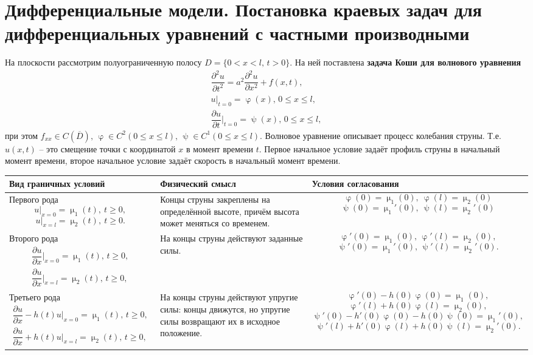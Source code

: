\documentclass[a4paper, 12pt]{report}
\numberwithin{equation}{section}
\renewcommand{\leq}{\leqslant}
\renewcommand{\geq}{\geqslant}
\renewcommand{\varphi}{\upvarphi}
\renewcommand{\psi}{\uppsi}
\renewcommand{\mu}{\upmu}
\newcommand{\pderiv}[2]{\dfrac{\partial #1}{\partial #2}}
\begin{document}
	\section{Дифференциальные модели. Постановка краевых задач для дифференциальных уравнений с частными производными}
	На плоскости рассмотрим полуограниченную полосу
	$D=\{0<x<l\text{, } t>0\}.$
	На ней поставлена \textbf{задача Коши для волнового уравнения}
	\begin{equation}
		\begin{gathered}
			\pderiv{^2u}{t^2}=a^2\pderiv{^2u}{x^2}+f(x,t),\\
			u|_{t=0}=\varphi(x)\text{, } 0\leq x\leq l,\\
			\pderiv{u}{t}\Bigr|_{t=0}=\psi(x)\text{, } 0\leq x\leq l,
		\end{gathered}
	\end{equation}
	при этом $f_{xx}\in C(\overline{D})\text{, } \varphi\in C^2(0\leq x\leq l)\text{, } \psi\in C^1(0\leq x\leq l).$
	Волновое уравнение описывает процесс колебания струны. Т.е. $u(x,t)$ -- это смещение точки с координатой $x$ в момент времени $t$. Первое начальное условие задаёт профиль струны в начальный момент времени, второе начальное условие задаёт скорость в начальный момент времени.
	\begin{table}[h!]
		\renewcommand{\arraystretch}{1.4}
		\begin{tabular}{|p{5.5cm}|p{4.5cm}|p{7cm}|}
			\hline
			\textbf{Вид граничных условий} & \textbf{Физический смысл} & \textbf{Условия согласования} \\
			\hline
			Первого рода $$u|_{x=0}=\mu_1(t),\ t \geq 0,$$ $$u|_{x=l}=\mu_2(t), \ t \geq 0.$$
			& 
			Концы струны закреплены на определённой высоте, причём высота может меняться со временем.
			& 
			$$\varphi(0)=\mu_1(0),\ \varphi(l)=\mu_2(0)$$  $$\psi(0)=\mu_1'(0),\ \psi(l)=\mu_2'(0)$$ \\
			\hline
			
			{Второго рода} $$\begin{gathered}
				\pderiv{u}{x}\Bigr|_{x=0}=\mu_1(t)\text{, } t\geq 0,\\
				\pderiv{u}{x}\Bigr|_{x=l}=\mu_2(t)\text{, } t\geq 0,
			\end{gathered}$$ 
			& 
			На концы струны действуют заданные силы.
			& 
			$$\varphi'(0)=\mu_1(0)\text{, } \varphi'(l)=\mu_2(0),$$
			$$\psi'(0)=\mu_1'(0)\text{, }\psi'(l)=\mu_2'(0).$$ \\
			\hline
			
			{Третьего рода} $$\begin{gathered}
				\pderiv{u}{x}-h(t)u\Bigr|_{x=0}=\mu_1(t)\text{, } t\geq 0,\\
				\pderiv{u}{x}+h(t)u\Bigr|_{x=l}=\mu_2(t)\text{, } t\geq 0,
			\end{gathered}$$
			& 
			На концы струны действуют упругие силы: концы движутся, но упругие силы возвращают их в исходное положение.
			& 
			$$\varphi'(0)-h(0)\varphi(0)=\mu_1(0),$$
			$$\varphi'(l)+h(0)\varphi(l)=\mu_2(0),$$
			$$\psi'(0)-h'(0)\varphi(0)-h(0)\psi(0)=\mu_1'(0),$$
			$$\psi'(l)+h'(0)\varphi(l)+h(0)\psi(l)=\mu_2'(0).$$ \\
			\hline
		\end{tabular}
	\end{table}
\end{document}
